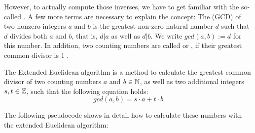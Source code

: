 However, to actually compute those inverses, we have to get familiar with the so-called . A few more terms are necessary to explain the concept: The  (GCD) of two nonzero integers $a$ and $b$ is the greatest non-zero natural number $d$ such that $d$ divides both $a$ and $b$, that is, $d|a$ as well as $d|b$. We write $ gcd (a, b):=d $ for this number. In addition, two counting numbers are called  or , if their greatest common divisor is $1$ .

The Extended Euclidean algorithm is a method to calculate the greatest common divisor of two counting numbers $ a $ and $ b \in \mathbb{N} $, as well as two additional integers $ s, t \in \mathbb{Z} $, such that the following equation holds:
\begin{equation}
\label{eq: erw_Eukl_algo}
gcd (a, b) = s \cdot a + t \cdot b
\end{equation}

The following pseudocode shows in detail how to calculate these numbers with the extended Euclidean algorithm:

